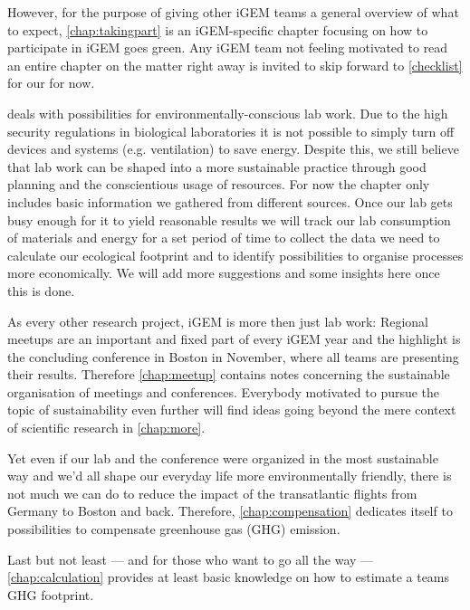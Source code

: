 However, for the purpose of giving other iGEM teams a general overview of what to expect, \cref{chap:takingpart} is an iGEM-specific chapter focusing on how to participate in iGEM goes green. Any iGEM team not feeling motivated to read an entire chapter on the matter right away is invited to skip forward to \cref{checklist} for our  for now.

 deals with possibilities for environmentally-conscious lab work. Due to the high security regulations in biological laboratories it is not possible to simply turn off devices and systems (e.g. ventilation) to save energy. Despite this, we still believe that lab work can be shaped into a more sustainable practice through good planning and the conscientious usage of resources. For now the chapter only includes basic information we gathered from different sources. Once our lab gets busy enough for it to yield reasonable results we will track our lab consumption of materials and energy for a set period of time to collect the data we need to calculate our ecological footprint and to identify possibilities to organise processes more economically. We will add more suggestions and some insights here once this is done.

As every other research project, iGEM is more then just lab work: Regional meetups are an important and fixed part of every iGEM year and the highlight is the concluding conference in Boston in November, where all teams are presenting their results. Therefore \cref{chap:meetup} contains notes concerning the sustainable organisation of meetings and conferences. Everybody motivated to pursue the topic of sustainability even further will find ideas going beyond the mere context of scientific research in \cref{chap:more}.

Yet even if our lab and the conference were organized in the most sustainable way and we'd all shape our everyday life more environmentally friendly, there is not much we can do to reduce the impact of the transatlantic flights from Germany to Boston and back. Therefore, \cref{chap:compensation} dedicates itself to possibilities to compensate greenhouse gas (GHG) emission.

Last but not least --- and for those who want to go all the way --- \cref{chap:calculation} provides at least basic knowledge on how to estimate a teams GHG footprint.
